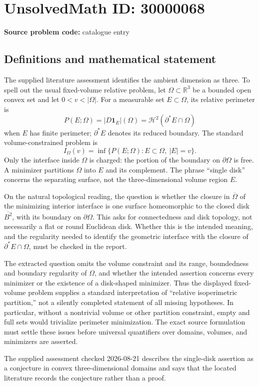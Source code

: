 \documentclass[11pt]{article}
\newcommand{\R}{\mathbb{R}}
\begin{document}
\section*{UnsolvedMath ID: 30000068}
\textbf{Source problem code:} catalogue entry
\subsection{Definitions and mathematical statement}
The supplied literature assessment identifies the ambient dimension as three. To spell out the usual fixed-volume relative problem, let \(\Omega\subset\R^3\) be a bounded open convex set and let \(0<v<|\Omega|\). For a measurable set \(E\subset\Omega\), its relative perimeter is
\[
P(E;\Omega)=|D\mathbf1_E|(\Omega)
=\mathcal H^2(\partial^*E\cap\Omega)
\]
when \(E\) has finite perimeter; \(\partial^*E\) denotes its reduced boundary. The standard volume-constrained problem is
\[
I_\Omega(v)=\inf\{P(E;\Omega):E\subset\Omega,\ |E|=v\}.
\]
Only the interface inside \(\Omega\) is charged: the portion of the boundary on \(\partial\Omega\) is free. A minimizer partitions \(\Omega\) into \(E\) and its complement. The phrase ``single disk'' concerns the separating surface, not the three-dimensional volume region \(E\).

On the natural topological reading, the question is whether the closure in \(\overline\Omega\) of the minimizing interior interface is one surface homeomorphic to the closed disk \(\overline{B^2}\), with its boundary on \(\partial\Omega\). This asks for connectedness and disk topology, not necessarily a flat or round Euclidean disk. Whether this is the intended meaning, and the regularity needed to identify the geometric interface with the closure of \(\partial^*E\cap\Omega\), must be checked in the report.

The extracted question omits the volume constraint and its range, boundedness and boundary regularity of \(\Omega\), and whether the intended assertion concerns every minimizer or the existence of a disk-shaped minimizer. Thus the displayed fixed-volume problem supplies a standard interpretation of ``relative isoperimetric partition,'' not a silently completed statement of all missing hypotheses. In particular, without a nontrivial volume or other partition constraint, empty and full sets would trivialize perimeter minimization. The exact source formulation must settle these issues before universal quantifiers over domains, volumes, and minimizers are asserted.

The supplied assessment checked 2026-08-21 describes the single-disk assertion as a conjecture in convex three-dimensional domains and says that the located literature records the conjecture rather than a proof.
\end{document}
